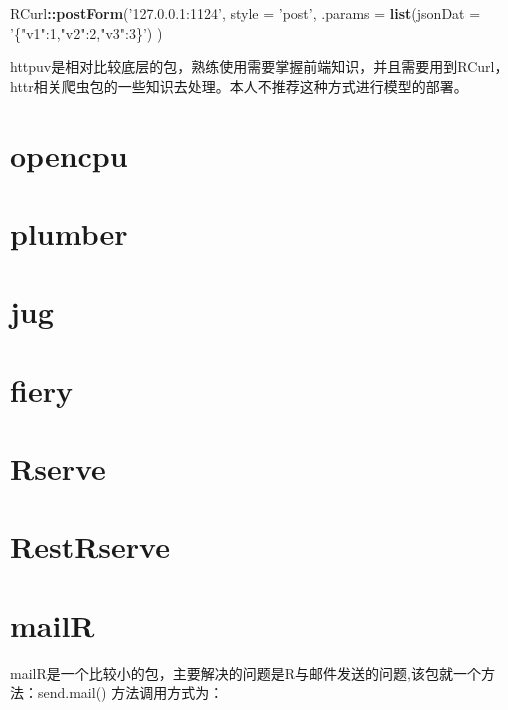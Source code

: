 \documentclass[]{book}
\newenvironment{Shaded}{\begin{snugshade}}{\end{snugshade}}
\newcommand{\KeywordTok}[1]{\textcolor[rgb]{0.13,0.29,0.53}{\textbf{#1}}}
\newcommand{\DataTypeTok}[1]{\textcolor[rgb]{0.13,0.29,0.53}{#1}}
\newcommand{\StringTok}[1]{\textcolor[rgb]{0.31,0.60,0.02}{#1}}
\newcommand{\OperatorTok}[1]{\textcolor[rgb]{0.81,0.36,0.00}{\textbf{#1}}}
\newcommand{\NormalTok}[1]{#1}
\theoremstyle{definition}
\theoremstyle{definition}
\theoremstyle{definition}
\theoremstyle{remark}
\begin{document}
\begin{Shaded}
\begin{Highlighting}[]

\NormalTok{RCurl}\OperatorTok{::}\KeywordTok{postForm}\NormalTok{(}\StringTok{'127.0.0.1:1124'}\NormalTok{,}
\DataTypeTok{style =} \StringTok{'post'}\NormalTok{,}
\DataTypeTok{.params =} \KeywordTok{list}\NormalTok{(}\DataTypeTok{jsonDat =} \StringTok{'\{"v1":1,"v2":2,"v3":3\}'}\NormalTok{)}
\NormalTok{)}
\end{Highlighting}
\end{Shaded}

httpuv是相对比较底层的包，熟练使用需要掌握前端知识，并且需要用到RCurl，httr相关爬虫包的一些知识去处理。本人不推荐这种方式进行模型的部署。

\chapter{opencpu}\label{opencpu}

\chapter{plumber}\label{plumber}

\chapter{jug}\label{jug}

\chapter{fiery}\label{fiery}

\chapter{Rserve}\label{rserve}

\chapter{RestRserve}\label{restrserve}

\chapter{mailR}\label{mailr}

mailR是一个比较小的包，主要解决的问题是R与邮件发送的问题,该包就一个方法：send.mail()
方法调用方式为：
\end{document}
